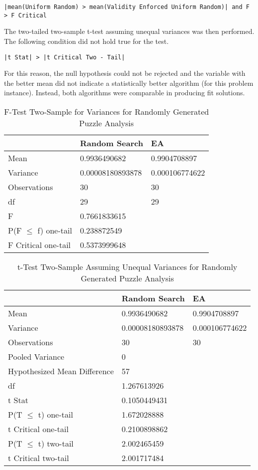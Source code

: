 \documentclass[11pt]{article}
\begin{document}
\begin{center}
\texttt{|mean(Uniform Random) > mean(Validity Enforced Uniform Random)| and F > F Critical}
\end{center}

The two-tailed two-sample t-test assuming unequal variances was then performed. The following condition did not hold true for the test.

\begin{center}
\texttt{|t Stat| > |t Critical Two - Tail|}
\end{center}

For this reason, the null hypothesis could not be rejected and the variable with the better mean did not indicate a statistically better algorithm (for this problem instance). Instead, both algorithms were comparable in producing fit solutions.


\begin{table}[H]
\centering
\caption{F-Test Two-Sample for Variances for Randomly Generated Puzzle Analysis}
\label{bonus_table4}
\begin{tabular}{l|l|l}
 & Random Search & EA \\ \hline
Mean & 0.9936490682 & 0.9904708897 \\
Variance & 0.00008180893878 & 0.000106774622 \\
Observations & 30 & 30 \\
df & 29 & 29 \\
F & 0.7661833615 &  \\
P(F $\leq$ f) one-tail & 0.238872549 &  \\
F Critical one-tail & 0.5373999648 & 
\end{tabular}
\end{table}


\begin{table}[H]
\centering
\caption{t-Test Two-Sample Assuming Unequal Variances for Randomly Generated Puzzle Analysis}
\label{bonus_table5}
\begin{tabular}{l|l|l}
 & Random Search & EA \\ \hline
Mean & 0.9936490682 & 0.9904708897 \\
Variance & 0.00008180893878 & 0.000106774622 \\
Observations & 30 & 30 \\
Pooled Variance & 0 &  \\
Hypothesized Mean Difference & 57 &  \\
df & 1.267613926 &  \\
t Stat & 0.1050449431 &  \\
P(T $\leq$ t) one-tail & 1.672028888 &  \\
t Critical one-tail & 0.2100898862 &  \\
P(T $\leq$ t) two-tail & 2.002465459 &  \\
t Critical two-tail & 2.001717484 & 
\end{tabular}
\end{table}
\end{document}
